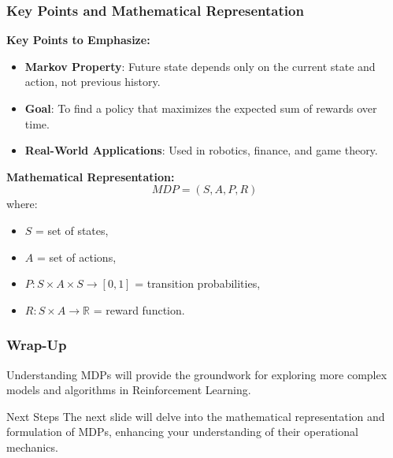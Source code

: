 \documentclass{beamer}
\begin{document}
\begin{frame}[fragile]
    \frametitle{Key Points and Mathematical Representation}
    
    \textbf{Key Points to Emphasize:}
    \begin{itemize}
        \item \textbf{Markov Property}: Future state depends only on the current state and action, not previous history.
        \item \textbf{Goal}: To find a policy that maximizes the expected sum of rewards over time.
        \item \textbf{Real-World Applications}: Used in robotics, finance, and game theory.
    \end{itemize}

    \textbf{Mathematical Representation:}
    \begin{equation}
        MDP = (S, A, P, R)
    \end{equation}
    where:
    \begin{itemize}
        \item \( S \) = set of states,
        \item \( A \) = set of actions,
        \item \( P: S \times A \times S \rightarrow [0, 1] \) = transition probabilities,
        \item \( R: S \times A \rightarrow \mathbb{R} \) = reward function.
    \end{itemize}
\end{frame}

\begin{frame}[fragile]
    \frametitle{Wrap-Up}
    Understanding MDPs will provide the groundwork for exploring more complex models and algorithms in Reinforcement Learning. 
    \begin{block}{Next Steps}
        The next slide will delve into the mathematical representation and formulation of MDPs, enhancing your understanding of their operational mechanics.
    \end{block}
\end{frame}
\end{document}
